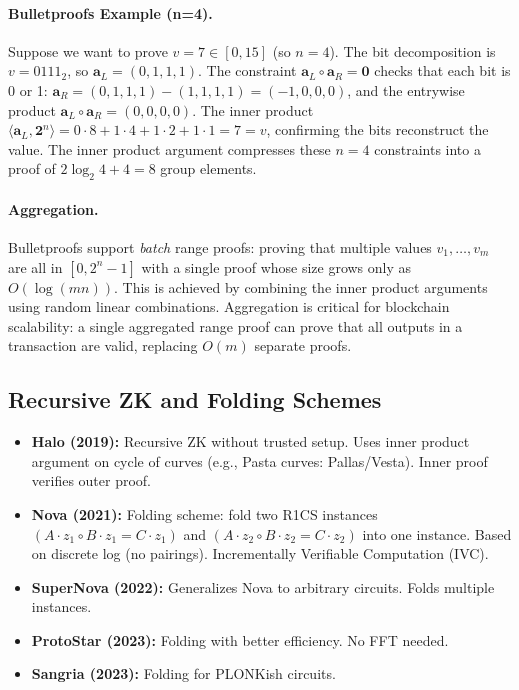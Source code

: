 \paragraph{Bulletproofs Example (n=4).} Suppose we want to prove $v = 7 \in [0, 15]$ (so $n=4$). The bit decomposition is $v = 0111_2$, so $\mathbf{a}_L = (0,1,1,1)$. The constraint $\mathbf{a}_L \circ \mathbf{a}_R = \mathbf{0}$ checks that each bit is 0 or 1: $\mathbf{a}_R = (0,1,1,1) - (1,1,1,1) = (-1,0,0,0)$, and the entrywise product $\mathbf{a}_L \circ \mathbf{a}_R = (0,0,0,0)$. The inner product $\langle \mathbf{a}_L, \mathbf{2}^n \rangle = 0\cdot8 + 1\cdot4 + 1\cdot2 + 1\cdot1 = 7 = v$, confirming the bits reconstruct the value. The inner product argument compresses these $n=4$ constraints into a proof of $2\log_2 4 + 4 = 8$ group elements.

\paragraph{Aggregation.} Bulletproofs support \emph{batch} range proofs: proving that multiple values $v_1,\dots,v_m$ are all in $[0, 2^n-1]$ with a single proof whose size grows only as $O(\log(mn))$. This is achieved by combining the inner product arguments using random linear combinations. Aggregation is critical for blockchain scalability: a single aggregated range proof can prove that all outputs in a transaction are valid, replacing $O(m)$ separate proofs.

\subsection{Recursive ZK and Folding Schemes}
\label{sec:zk:recursive}

\begin{itemize}
\item \textbf{Halo (2019):} Recursive ZK without trusted setup. Uses inner product argument on cycle of curves (e.g., Pasta curves: Pallas/Vesta). Inner proof verifies outer proof.
\item \textbf{Nova (2021):} Folding scheme: fold two R1CS instances $(A \cdot z_1 \circ B \cdot z_1 = C \cdot z_1)$ and $(A \cdot z_2 \circ B \cdot z_2 = C \cdot z_2)$ into one instance. Based on discrete log (no pairings). Incrementally Verifiable Computation (IVC).
\item \textbf{SuperNova (2022):} Generalizes Nova to arbitrary circuits. Folds multiple instances.
\item \textbf{ProtoStar (2023):} Folding with better efficiency. No FFT needed.
\item \textbf{Sangria (2023):} Folding for PLONKish circuits.
\end{itemize}

